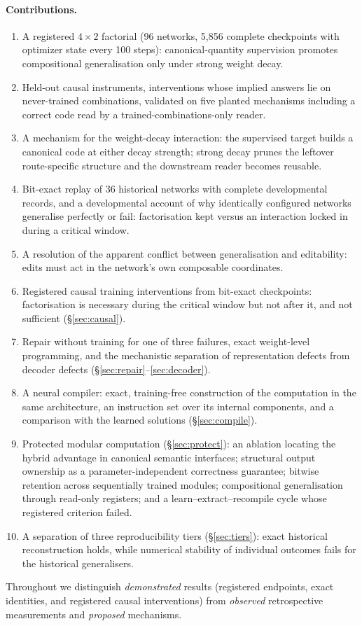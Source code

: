\documentclass[11pt]{article}
\begin{document}
\paragraph{Contributions.}
\begin{enumerate}[leftmargin=*,itemsep=1pt]
\item A registered $4\times2$ factorial (96 networks, 5,856 complete checkpoints with optimizer state every 100
steps): canonical-quantity supervision promotes compositional generalisation only under strong weight decay.
\item Held-out causal instruments, interventions whose implied answers lie on never-trained combinations, validated
on five planted mechanisms including a correct code read by a trained-combinations-only reader.
\item A mechanism for the weight-decay interaction: the supervised target builds a canonical code at either decay
strength; strong decay prunes the leftover route-specific structure and the downstream reader becomes reusable.
\item Bit-exact replay of 36 historical networks with complete developmental records, and a developmental account of
why identically configured networks generalise perfectly or fail: factorisation kept versus an interaction locked
in during a critical window.
\item A resolution of the apparent conflict between generalisation and editability: edits must act in the network's
own composable coordinates.
\item Registered causal training interventions from bit-exact checkpoints: factorisation is necessary during the
critical window but not after it, and not sufficient (\S\ref{sec:causal}).
\item Repair without training for one of three failures, exact weight-level programming, and the mechanistic
separation of representation defects from decoder defects (\S\ref{sec:repair}--\ref{sec:decoder}).
\item A neural compiler: exact, training-free construction of the computation in the same architecture, an
instruction set over its internal components, and a comparison with the learned solutions (\S\ref{sec:compile}).
\item Protected modular computation (\S\ref{sec:protect}): an ablation locating the hybrid advantage in canonical
semantic interfaces; structural output ownership as a parameter-independent correctness guarantee; bitwise retention
across sequentially trained modules; compositional generalisation through read-only registers; and a
learn--extract--recompile cycle whose registered criterion failed.
\item A separation of three reproducibility tiers (\S\ref{sec:tiers}): exact historical reconstruction holds, while
numerical stability of individual outcomes fails for the historical generalisers.
\end{enumerate}
Throughout we distinguish \emph{demonstrated} results (registered endpoints, exact identities, and registered causal
interventions) from \emph{observed} retrospective measurements and \emph{proposed} mechanisms.
\end{document}
